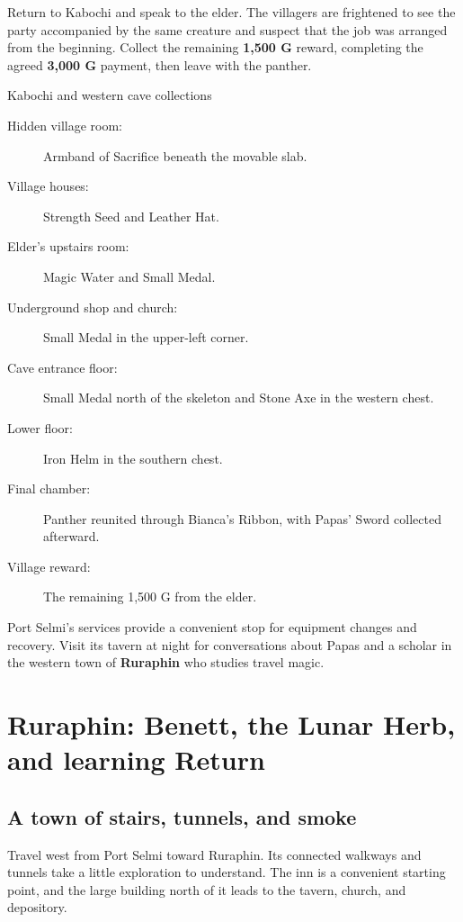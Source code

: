 Return to Kabochi and speak to the elder. The villagers are frightened
to see the party accompanied by the same creature and suspect that
the job was arranged from the beginning. Collect the remaining
\textbf{1,500 G} reward, completing the agreed \textbf{3,000 G}
payment, then leave with the panther.

\begin{routecheck}{Kabochi and western cave collections}
\begin{description}
  \item[Hidden village room:] Armband of Sacrifice beneath the movable slab.
  \item[Village houses:] Strength Seed and Leather Hat.
  \item[Elder's upstairs room:] Magic Water and Small Medal.
  \item[Underground shop and church:] Small Medal in the upper-left corner.
  \item[Cave entrance floor:] Small Medal north of the skeleton and
    Stone Axe in the western chest.
  \item[Lower floor:] Iron Helm in the southern chest.
  \item[Final chamber:] Panther reunited through Bianca's Ribbon,
    with Papas' Sword collected afterward.
  \item[Village reward:] The remaining 1,500 G from the elder.
\end{description}
\end{routecheck}

Port Selmi's services provide a convenient stop for equipment changes
and recovery. Visit its tavern at night for conversations about Papas
and a scholar in the western town of \textbf{Ruraphin} who studies
travel magic.

\section{Ruraphin: Benett, the Lunar Herb, and learning Return}

\subsection*{A town of stairs, tunnels, and smoke}

Travel west from Port Selmi toward Ruraphin. Its connected walkways
and tunnels take a little exploration to understand. The inn is a
convenient starting point, and the large building north of it leads
to the tavern, church, and depository.

